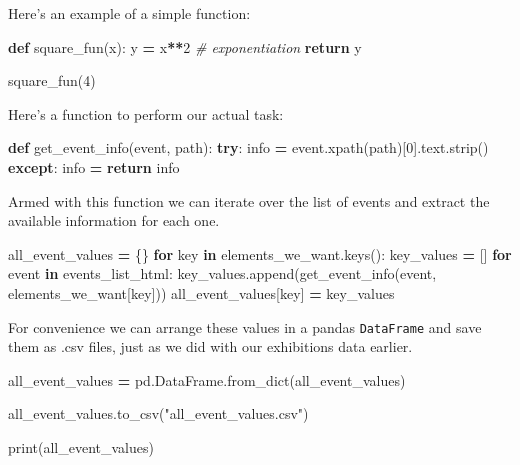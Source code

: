\documentclass[
]{book}
\newenvironment{Shaded}{\begin{snugshade}}{\end{snugshade}}
\newcommand{\BuiltInTok}[1]{#1}
\newcommand{\CommentTok}[1]{\textcolor[rgb]{0.56,0.35,0.01}{\textit{#1}}}
\newcommand{\ControlFlowTok}[1]{\textcolor[rgb]{0.13,0.29,0.53}{\textbf{#1}}}
\newcommand{\DecValTok}[1]{\textcolor[rgb]{0.00,0.00,0.81}{#1}}
\newcommand{\KeywordTok}[1]{\textcolor[rgb]{0.13,0.29,0.53}{\textbf{#1}}}
\newcommand{\NormalTok}[1]{#1}
\newcommand{\OperatorTok}[1]{\textcolor[rgb]{0.81,0.36,0.00}{\textbf{#1}}}
\newcommand{\StringTok}[1]{\textcolor[rgb]{0.31,0.60,0.02}{#1}}
\begin{document}
Here's an example of a simple function:

\begin{Shaded}
\begin{Highlighting}[]
\KeywordTok{def}\NormalTok{ square\_fun(x):}
\NormalTok{    y }\OperatorTok{=}\NormalTok{ x}\OperatorTok{**}\DecValTok{2} \CommentTok{\# exponentiation}
    \ControlFlowTok{return}\NormalTok{ y}

\NormalTok{square\_fun(}\DecValTok{4}\NormalTok{)    }
\end{Highlighting}
\end{Shaded}

Here's a function to perform our actual task:

\begin{Shaded}
\begin{Highlighting}[]
\KeywordTok{def}\NormalTok{ get\_event\_info(event, path):}
    \ControlFlowTok{try}\NormalTok{:}
\NormalTok{        info }\OperatorTok{=}\NormalTok{ event.xpath(path)[}\DecValTok{0}\NormalTok{].text.strip()}
    \ControlFlowTok{except}\NormalTok{:}
\NormalTok{        info }\OperatorTok{=} \StringTok{\textquotesingle{}\textquotesingle{}}
    \ControlFlowTok{return}\NormalTok{ info}
\end{Highlighting}
\end{Shaded}

Armed with this function we can iterate over the list of events and extract the available information for each one.

\begin{Shaded}
\begin{Highlighting}[]
\NormalTok{all\_event\_values }\OperatorTok{=}\NormalTok{ \{\}}
\ControlFlowTok{for}\NormalTok{ key }\KeywordTok{in}\NormalTok{ elements\_we\_want.keys():}
\NormalTok{    key\_values }\OperatorTok{=}\NormalTok{ []}
    \ControlFlowTok{for}\NormalTok{ event }\KeywordTok{in}\NormalTok{ events\_list\_html: }
\NormalTok{        key\_values.append(get\_event\_info(event, elements\_we\_want[key]))}
\NormalTok{    all\_event\_values[key] }\OperatorTok{=}\NormalTok{ key\_values}
\end{Highlighting}
\end{Shaded}

For convenience we can arrange these values in a pandas \texttt{DataFrame} and save them as .csv files, just as we did with our exhibitions data earlier.

\begin{Shaded}
\begin{Highlighting}[]
\NormalTok{all\_event\_values }\OperatorTok{=}\NormalTok{ pd.DataFrame.from\_dict(all\_event\_values)}

\NormalTok{all\_event\_values.to\_csv(}\StringTok{"all\_event\_values.csv"}\NormalTok{)}

\BuiltInTok{print}\NormalTok{(all\_event\_values)}
\end{Highlighting}
\end{Shaded}
\end{document}
